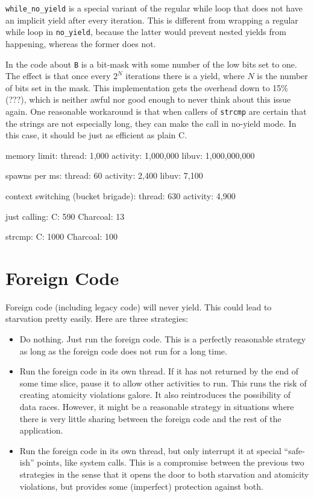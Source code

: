 \documentclass[10pt,preprint]{sigplanconf}
\begin{document}

\texttt{while\_no\_yield} is a special variant of the regular while loop that does not have an implicit yield after every iteration.
This is different from wrapping a regular while loop in \texttt{no\_yield}, because the latter would prevent nested yields from happening, whereas the former does not.

In the code about \texttt{B} is a bit-mask with some number of the low bits set to one.
The effect is that once every $2^N$ iterations there is a yield, where $N$ is the number of bits set in the mask.
This implementation gets the overhead down to 15\% (???), which is neither awful nor good enough to never think about this issue again.
One reasonable workaround is that when callers of \texttt{strcmp} are certain that the strings are not especially long, they can make the call in no-yield mode.
In this case, it should be just as efficient as plain C.

memory limit: thread: 1,000 activity: 1,000,000 libuv: 1,000,000,000

spawns per ms: thread: 60 activity: 2,400 libuv: 7,100

context switching (bucket brigade): thread: 630  activity: 4,900

just calling: C: 590  Charcoal: 13

strcmp: C: 1000 Charcoal: 100



\section{Foreign Code}

Foreign code (including legacy code) will never yield.  This could lead
to starvation pretty easily.  Here are three strategies:

\begin{itemize}
\item Do nothing.
  Just run the foreign code.
  This is a perfectly reasonable strategy as long as the foreign code does not run for a long time.
\item Run the foreign code in its own thread.
  If it has not returned by the end of some time slice, pause it to allow other activities to run.
  This runs the risk of creating atomicity violations galore.
  It also reintroduces the possibility of data races.
  However, it might be a reasonable strategy in situations where there is very little sharing between the foreign code and the rest of the application.
\item Run the foreign code in its own thread, but only interrupt it at special ``safe-ish'' points, like system calls.
  This is a compromise between the previous two strategies in the sense that it opens the door to both starvation and atomicity violations, but provides some (imperfect) protection against both.
\end{itemize}
\end{document}
